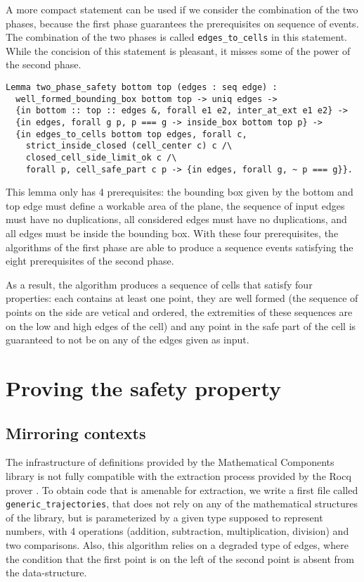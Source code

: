 \documentclass[a4paper, USenglish, cleveref, autoref, thm-restate]{lipics-v2021}
\begin{document}
A more compact statement can be used if we consider the combination of the
two phases, because the first phase guarantees the prerequisites on 
sequence of events.  The combination of the two phases is called
{\tt edges\_to\_cells} in this statement.
While the concision of this statement is pleasant, it
misses some of the power of the second phase.
\begin{verbatim}
Lemma two_phase_safety bottom top (edges : seq edge) :
  well_formed_bounding_box bottom top -> uniq edges ->
  {in bottom :: top :: edges &, forall e1 e2, inter_at_ext e1 e2} ->
  {in edges, forall g p, p === g -> inside_box bottom top p} ->
  {in edges_to_cells bottom top edges, forall c,
    strict_inside_closed (cell_center c) c /\
    closed_cell_side_limit_ok c /\
    forall p, cell_safe_part c p -> {in edges, forall g, ~ p === g}}.
\end{verbatim}
This lemma only has 4 prerequisites: the bounding box given by the
bottom and top edge must define a workable area of the plane, the sequence
of input edges must have no duplications, all considered edges must have
no duplications, and all edges must be inside the bounding box.  With these
four prerequisites, the algorithms of the first phase are able to produce
a sequence events satisfying the eight prerequisites of the second phase.

As a result, the algorithm produces a sequence of cells that satisfy four
properties: each contains at least one point, they are well formed (the 
sequence of points on the side are vetical and ordered, the extremities of
these sequences are on the low and high edges of the cell) and any point
in the safe part of the cell is guaranteed to not be on any of the edges
given as input.

\section{Proving the safety property}
\subsection{Mirroring contexts}
The infrastructure of definitions provided by the {\sc Mathematical
Components} library is not fully compatible with the extraction
process provided by the Rocq prover \cite{extraction}.
To obtain code that is amenable for extraction, we write a
first file called {\tt generic\_trajectories}, that does not rely on
any of the mathematical structures of the library, but is
parameterized by a given type supposed to represent numbers, with 4
operations (addition, subtraction, multiplication, division) and two
comparisons.  Also, this algorithm relies on a degraded type of edges,
where the condition that the first point is on the left of the second
point is absent from the data-structure.
\end{document}
